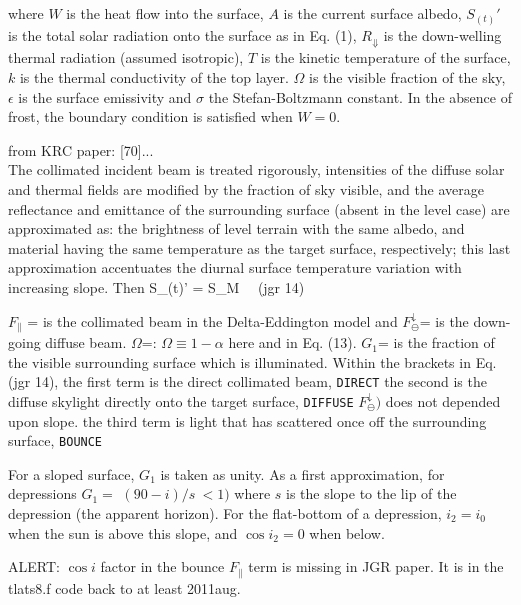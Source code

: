 where $W$ is the heat flow into the surface, $A$ is the current surface albedo,
$S_{(t)}'$ is the total solar radiation onto the surface as in Eq. (1), $
R_{\Downarrow}$ is the down-welling thermal radiation (assumed isotropic), $T$
is the kinetic temperature of the surface, $k$ is the thermal conductivity of
the top layer. $\Omega$ is the visible fraction of the sky, $\epsilon$ is the
surface emissivity and $\sigma$ the Stefan-Boltzmann constant.  In the absence
of frost, the boundary condition is satisfied when $W=0$. \normalsize


from KRC paper: [70]... \small
\\ The collimated incident
beam is treated rigorously, intensities of the diffuse solar and thermal fields
are modified by the fraction of sky visible, and the average reflectance and
emittance of the surrounding surface (absent in the level case) are approximated
as: the brightness of level terrain with the same albedo, and material having
the same temperature as the target surface, respectively; this last
approximation accentuates the diurnal surface temperature variation with
increasing slope. Then 
 \qbn S_{(t)}' = S_M    \ \ (jgr 14) \qen

$F_\parallel$ = is the collimated beam in the Delta-Eddington model and
$F_\ominus^\downarrow$= is the down-going diffuse beam. 
$\Omega$=: $\Omega \equiv 1 - \alpha $ here and in
Eq. (13). $G_1$= is the fraction of the visible surrounding surface which
is illuminated. Within the brackets in Eq. (jgr 14),
\qi the first term is the direct collimated beam, \texttt{DIRECT}
\qi the second is the diffuse skylight directly onto the target surface, \texttt{DIFFUSE}
\qii $ F_\ominus^\downarrow)$ does not depended upon slope.
\qi the third term is light that has scattered once off the
surrounding surface, \texttt{BOUNCE}

For a sloped surface, $G_1$ is taken as unity. As a first approximation, for
depressions $G_1=$ $(90-i)/s \ < 1)$ where $s$ is the slope to the lip of the
depression (the apparent horizon). For the flat-bottom of a depression, $i_2 =
i_0$ when the sun is above this slope, and $ \cos i_2 =0$ when below. \normalsize


ALERT:  $\cos i$ factor in the bounce $F_\parallel$ term is missing in JGR paper.
It is in the tlats8.f code back to at least 2011aug.

